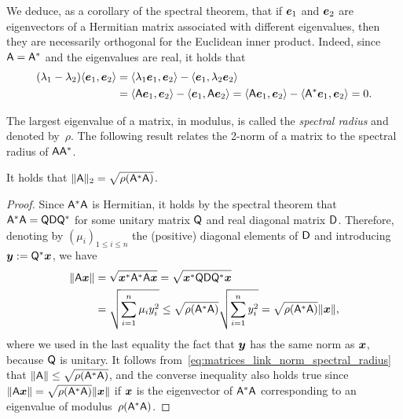 We deduce, as a corollary of the spectral theorem,
that if $\mathbf{\boldsymbol{e}}_1$ and $\mathbf{\boldsymbol{e}}_2$ are eigenvectors of a Hermitian matrix associated with different eigenvalues,
then they are necessarily orthogonal for the Euclidean inner product.
Indeed, since $\mathsf A = \mathsf A^*$ and the eigenvalues are real, it holds that
\begin{align*}
    (\lambda_1 - \lambda_2) \langle\mathbf{\boldsymbol{e}}_1, \mathbf{\boldsymbol{e}}_2\rangle
    &= \langle\lambda_1 \mathbf{\boldsymbol{e}}_1, \mathbf{\boldsymbol{e}}_2\rangle - \langle\mathbf{\boldsymbol{e}}_1, \lambda_2 \mathbf{\boldsymbol{e}}_2\rangle \\
    &= \langle\mathsf A \mathbf{\boldsymbol{e}}_1, \mathbf{\boldsymbol{e}}_2\rangle - \langle\mathbf{\boldsymbol{e}}_1, \mathsf A \mathbf{\boldsymbol{e}}_2\rangle
    = \langle\mathsf A \mathbf{\boldsymbol{e}}_1, \mathbf{\boldsymbol{e}}_2\rangle - \langle\mathsf A^* \mathbf{\boldsymbol{e}}_1, \mathbf{\boldsymbol{e}}_2\rangle = 0.
\end{align*}

The largest eigenvalue of a matrix, in modulus,
is called the \emph{spectral radius} and denoted by~$\rho$.
The following result relates the 2-norm of a matrix to the spectral radius of $\mathsf A \mathsf A^*$.
\begin{proposition}
    It holds that $\lVert\mathsf A\rVert_2 = \sqrt{\rho(\mathsf A^* \mathsf A)}$.
\end{proposition}
\begin{proof}
    Since $\mathsf A^* \mathsf A$ is Hermitian,
    it holds by the spectral theorem that $\mathsf A^* \mathsf A = \mathsf Q \mathsf D \mathsf Q^*$ for some unitary matrix $\mathsf Q$ and real diagonal matrix $\mathsf D$.
    Therefore, denoting by $(\mu_i)_{1 \leq i \leq n}$ the (positive) diagonal elements of $\mathsf D$
    and introducing $\mathbf{\boldsymbol{y}} := \mathsf Q^* \mathbf{\boldsymbol{x}}$,
    we have
    \begin{align}
        \nonumber
        \lVert\mathsf A \mathbf{\boldsymbol{x}}\rVert
        &= \sqrt{\mathbf{\boldsymbol{x}}^* \mathsf A^* \mathsf A \mathbf{\boldsymbol{x}}}
        = \sqrt{\mathbf{\boldsymbol{x}}^* \mathsf Q \mathsf D \mathsf Q^* \mathbf{\boldsymbol{x}}} \\
        \label{eq:matrices_link_norm_spectral_radius}
        &= \sqrt{\sum_{i=1}^{n} \mu_i y_i^2}
        \leq \sqrt{\rho(\mathsf A^* \mathsf A)} \sqrt{\sum_{i=1}^{n} y_i^2}
        =  \sqrt{\rho(\mathsf A^* \mathsf A)} \lVert\mathbf{\boldsymbol{x}}\rVert,
    \end{align}
    where we used in the last equality the fact that $\mathbf{\boldsymbol{y}}$ has the same norm as $\mathbf{\boldsymbol{x}}$,
    because $\mathsf Q$ is unitary.
    It follows from~\eqref{eq:matrices_link_norm_spectral_radius} that $\lVert\mathsf A\rVert \leq \sqrt{\rho(\mathsf A^* \mathsf A)}$,
    and the converse inequality also holds true since $\lVert\mathsf A \mathbf{\boldsymbol{x}}\rVert = \sqrt{\rho(\mathsf A^* \mathsf A)} \lVert\mathbf{\boldsymbol{x}}\rVert$
    if $\mathbf{\boldsymbol{x}}$ is the eigenvector of $\mathsf A^* \mathsf A$ corresponding to an eigenvalue of modulus~$\rho(\mathsf A^* \mathsf A)$.
\end{proof}

